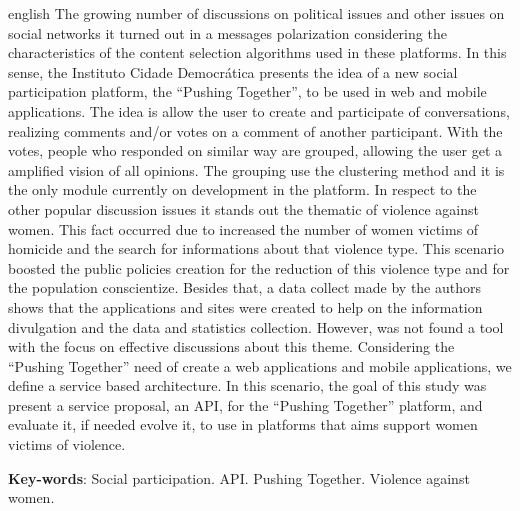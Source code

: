 \begin{resumo}[Abstract]
 \begin{otherlanguage*}{english}
  The growing number of discussions on political issues and other issues on social networks it turned out in a messages polarization considering the characteristics 
  of the content selection algorithms used in these platforms. In this sense, the Instituto Cidade Democrática presents the idea of a new social participation 
  platform, the ``Pushing Together'', to be used in web and mobile applications. The idea is allow the user to create and participate of conversations, realizing 
  comments and/or votes on a comment of another participant. With the votes, people who responded on similar way are grouped, allowing the user get a amplified 
  vision of all opinions. The grouping use the clustering method and it is the only module currently on development in the platform. In respect to the other popular 
  discussion issues it stands out the thematic of violence against women. This fact occurred due to increased the number of women victims of homicide and the search 
  for informations about that violence type. This scenario boosted the public policies creation for the reduction of this violence type and for the population 
  conscientize. Besides that, a data collect made by the authors shows that the applications and sites were created to help on the information divulgation and the 
  data and statistics collection. However, was not found a tool with the focus on effective discussions about this theme. Considering the ``Pushing Together'' need of 
  create a web applications and mobile applications, we define a service based architecture. In this scenario, the goal of this study was present a service 
  proposal, an API, for the ``Pushing Together'' platform, and evaluate it, if needed evolve it, to use in platforms that aims support women victims of violence.


   \vspace{\onelineskip}
 
   \noindent 
   \textbf{Key-words}: Social participation. API. Pushing Together. Violence against women.
 \end{otherlanguage*}
\end{resumo}
